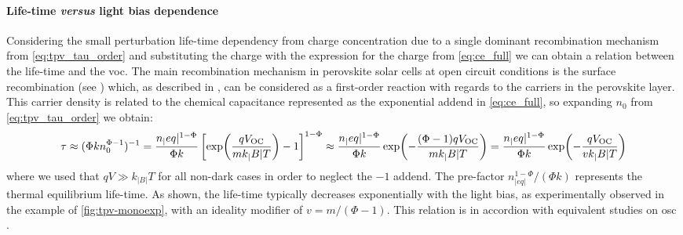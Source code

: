 		\paragraph{Life\hyp{}time \textsl{versus} light bias dependence}\label{tpv_tau_vs_intensity}
		Considering the small perturbation life\hyp{}time dependency from charge concentration due to a single dominant recombination mechanism from \cref{eq:tpv_tau_order} and substituting the charge with the expression for the charge from \cref{eq:ce_full} we can obtain a relation between the life\hyp{}time and the \gls{voc}.
		The main recombination mechanism in perovskite solar cells at open circuit conditions is the surface recombination (see ) which, as described in , can be considered as a first\hyp{}order reaction with regards to the carriers \label{tpv_chemical_charge}in the perovskite layer.
		This carrier density is related to the chemical capacitance represented as the exponential addend in \cref{eq:ce_full}, so expanding $n_0$ from \cref{eq:tpv_tau_order} we obtain:
		\begin{dmath}\label{eq:tpv_tau_vs_intensity}
			\tau \approx (\Phi k n_0^{\Phi-1})^{-1} = \frac{n_|eq|^{1-\Phi}}{\Phi k} \left[\exp(\frac{q\voc}{mk_|B|T}) - 1\right]^{1-\Phi} \approx \frac{n_|eq|^{1-\Phi}}{\Phi k} \exp(-\frac{(\Phi-1)q\voc}{mk_|B|T}) = \frac{n_|eq|^{1-\Phi}}{\Phi k} \exp(-\frac{q\voc}{vk_|B|T})
		\end{dmath}
		where we used that $qV \gg k_|B|T$ for all non-dark cases in order to neglect the $-1$ addend.
		The pre\hyp{}factor $n_|eq|^{1-\Phi}/(\Phi k)$ represents the thermal equilibrium life\hyp{}time.
		As shown, the life\hyp{}time typically decreases exponentially with the light bias, as experimentally observed in the example of \cref{fig:tpv-monoexp}, with an ideality modifier of $v = m/(\Phi-1)$.
		This relation is in accordion with equivalent studies on \gls{osc} \cite{Shuttle2008,Shuttle2008d,Credgington2011}.

